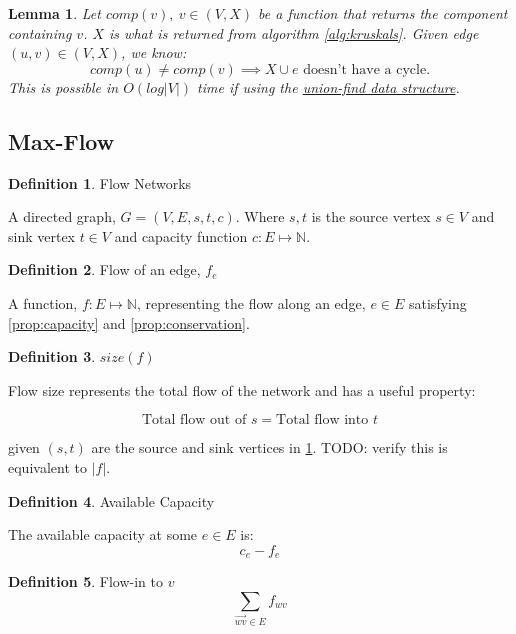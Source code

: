 \documentclass{article}
\newtheorem{lemma}[theorem]{Lemma}
\theoremstyle{definition}
\newtheorem{definition}{Definition}[section]
\begin{document}
\begin{lemma}
	Let $comp(v), \: v \in (V,X)$ be a function that returns the component containing $v$. $X$ is what is returned from algorithm \ref{alg:kruskals}. Given edge $(u,v) \in (V,X)$, we know:
	$$comp(u) \neq comp(v) \implies X \cup e \text{ doesn't have a cycle.}$$
	This is possible in $O(log|V|)$ time if using the \href{https://en.wikipedia.org/wiki/Disjoint-set_data_structure}{union-find data structure}.
\end{lemma}

\subsection{Max-Flow}
\begin{definition}{Flow Networks}
\label{def:flow_networks}

A directed graph, $G = (V, E, s, t, c)$. Where $s, t$ is the source vertex $s \in V$ and sink vertex $t \in V$ and capacity function $c:E \mapsto \mathbb{N}$.
\end{definition}


\begin{definition}{Flow of an edge, $f_e$}
\label{prop:flow_edge}
	
A function, $f:E \mapsto \mathbb{N}$, representing the flow along an edge, $e \in E$ satisfying \ref{prop:capacity} and \ref{prop:conservation}.
\end{definition}

\begin{definition}{$size(f)$}
\label{prop:size}
	
Flow size represents the total flow of the network and has a useful property:
	
$$\text{Total flow out of } s = \text{Total flow into } t$$
	
given $(s, t)$ are the source and sink vertices in \ref{def:flow_networks}. TODO: verify this is equivalent to $|f|$.
\end{definition}

\begin{definition}{Available Capacity}
\label{def:available_cap}

The available capacity at some $e \in E$ is:
$$c_e - f_e$$
\end{definition}

\begin{definition}{Flow-in to $v$}
\label{def:flowin}
$$\sum_{\overrightarrow{wv} \in E}{f_{wv}}$$
\end{definition}
\end{document}
